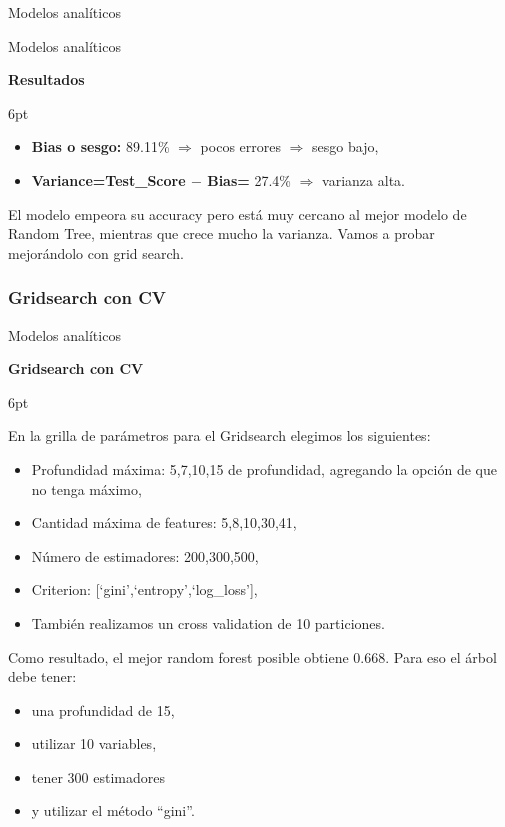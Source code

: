 \documentclass[pdf]{beamer}
\def\vspace{}%
\begin{document}
{\begin{frame}{Modelos analíticos}
\end{frame}

\begin{frame}{Modelos analíticos}
    \begin{Large}
        \textbf{Resultados}
    \end{Large}

\vspace{6pt}    
    \begin{itemize}
        \item \textbf{Bias o sesgo:} 89.11\% $\Rightarrow$ pocos errores $\Rightarrow$ sesgo bajo,
        \item \textbf{Variance=Test\_Score $-$ Bias=} 27.4\% $\Rightarrow$ varianza alta.
        \end{itemize}

    El modelo empeora su accuracy pero está muy cercano al mejor modelo de Random Tree, mientras que crece mucho la varianza. Vamos a probar mejorándolo con grid search.

\end{frame}

    \subsubsection{Gridsearch con CV}

\begin{frame}{Modelos analíticos}

    \begin{Large}
        \textbf{Gridsearch con CV}
    \end{Large}
    \vspace{6pt}

    En la grilla de parámetros para el Gridsearch elegimos los siguientes:
    \begin{itemize}
        \item Profundidad máxima: 5,7,10,15 de profundidad, agregando la opción de que no tenga máximo,
        \item Cantidad máxima de features: 5,8,10,30,41,
        \item Número de estimadores: 200,300,500,
        \item Criterion: [`gini',`entropy',`log\_loss'],
        \item También realizamos un cross validation de 10 particiones.
    \end{itemize}
    
    Como resultado, el mejor random forest posible obtiene 0.668. Para eso el árbol debe tener: 
    \begin{itemize}
        \item una profundidad de 15, 
        \item utilizar  10  variables, 
        \item tener  300  estimadores 
        \item y utilizar el método ``gini''.
    \end{itemize}


\end{frame}}
\end{document}
